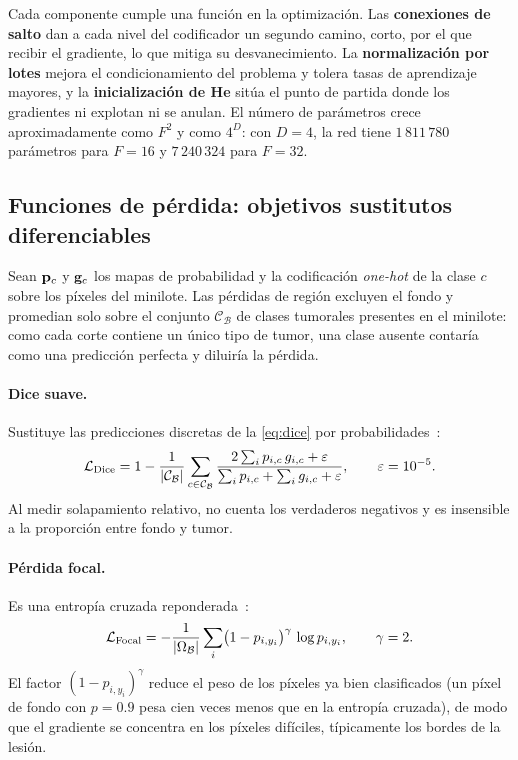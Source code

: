 \clearpage

Cada componente cumple una función en la optimización. Las \textbf{conexiones de salto} dan a cada nivel del codificador un segundo camino, corto, por el que recibir el gradiente, lo que mitiga su desvanecimiento. La \textbf{normalización por lotes} mejora el condicionamiento del problema y tolera tasas de aprendizaje mayores, y la \textbf{inicialización de He} sitúa el punto de partida donde los gradientes ni explotan ni se anulan. El número de parámetros crece aproximadamente como $F^{2}$ y como $4^{D}$: con $D=4$, la red tiene $1\,811\,780$ parámetros para $F=16$ y $7\,240\,324$ para $F=32$.

\subsection{Funciones de pérdida: objetivos sustitutos diferenciables}\label{subsec:perdidas}

Sean $\mathbf{p}_{c}$ y $\mathbf{g}_{c}$ los mapas de probabilidad y la codificación \emph{one-hot} de la clase $c$ sobre los píxeles del minilote. Las pérdidas de región excluyen el fondo y promedian solo sobre el conjunto $\mathcal{C}_{\mathcal{B}}$ de clases tumorales presentes en el minilote: como cada corte contiene un único tipo de tumor, una clase ausente contaría como una predicción perfecta y diluiría la pérdida.

\paragraph{Dice suave.} Sustituye las predicciones discretas de la \cref{eq:dice} por probabilidades~\cite{milletari2016vnet}:
\begin{equation}\label{eq:dice-suave}
  \mathcal{L}_{\mathrm{Dice}} = 1 - \frac{1}{|\mathcal{C}_{\mathcal{B}}|}\sum_{c\in\mathcal{C}_{\mathcal{B}}} \frac{2\sum_i p_{i,c}\,g_{i,c} + \varepsilon}{\sum_i p_{i,c} + \sum_i g_{i,c} + \varepsilon}, \qquad \varepsilon = 10^{-5}.
\end{equation}
Al medir solapamiento relativo, no cuenta los verdaderos negativos y es insensible a la proporción entre fondo y tumor.

\paragraph{Pérdida focal.} Es una entropía cruzada reponderada~\cite{lin2017focal}:
\begin{equation}\label{eq:focal}
  \mathcal{L}_{\mathrm{Focal}} = -\frac{1}{|\Omega_{\mathcal{B}}|}\sum_{i} \bigl(1-p_{i,y_i}\bigr)^{\gamma}\,\log p_{i,y_i}, \qquad \gamma = 2.
\end{equation}
El factor $(1-p_{i,y_i})^{\gamma}$ reduce el peso de los píxeles ya bien clasificados (un píxel de fondo con $p=0.9$ pesa cien veces menos que en la entropía cruzada), de modo que el gradiente se concentra en los píxeles difíciles, típicamente los bordes de la lesión.


